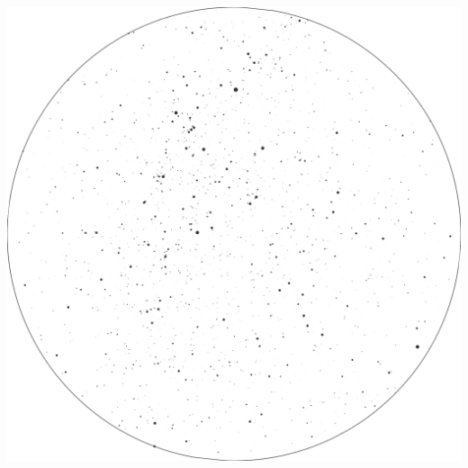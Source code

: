 \documentclass{./SAS-class-skygen}
\begin{document}
	\vspace{0.5cm}
    \begin{center}
    \includegraphics[width=\textwidth]{./pics/skychart25.png}
    \end{center}
    
    
\end{document}

